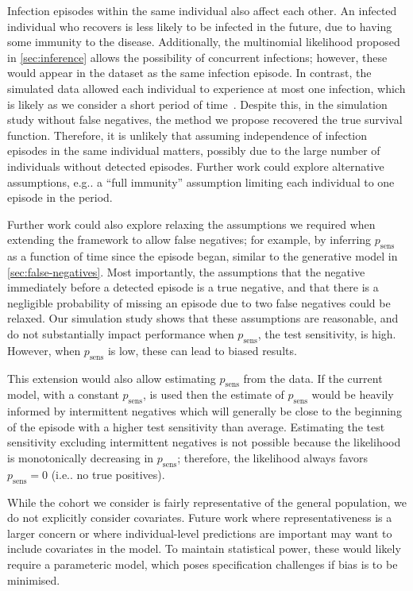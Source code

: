 \documentclass[referee,useAMS,usenatbib]{biom}
\makeatletter
\newcommand{\psens}{p_\text{sens}}
\DeclareRobustCommand\onedot{\futurelet\@let@token\@onedot}
\def\@onedot{\ifx\@let@token.\else.\null\fi\xspace}
\def\eg{e.g\onedot} \def\Eg{{E.g}\onedot}
\def\ie{i.e\onedot} \def\Ie{{I.e}\onedot}
\makeatother
\begin{document}
Infection episodes within the same individual also affect each other.
An infected individual who recovers is less likely to be infected in the future, due to having some immunity to the disease.
Additionally, the multinomial likelihood proposed in \cref{sec:inference} allows the possibility of concurrent infections; however, these would appear in the dataset as the same infection episode.
In contrast, the simulated data allowed each individual to experience at most one infection, which is likely as we consider a short period of time~\citep{milneImmunity}.
Despite this, in the simulation study without false negatives, the method we propose recovered the true survival function.
Therefore, it is unlikely that assuming independence of infection episodes in the same individual matters, possibly due to the large number of individuals without detected episodes.
Further work could explore alternative assumptions, \eg a ``full immunity'' assumption limiting each individual to one episode in the period.

Further work could also explore relaxing the assumptions we required when extending the framework to allow false negatives; for example, by inferring $\psens$ as a function of time since the episode began, similar to the generative model in \cref{sec:false-negatives}.
Most importantly, the assumptions that the negative immediately before a detected episode is a true negative, and that there is a negligible probability of missing an episode due to two false negatives could be relaxed.
Our simulation study shows that these assumptions are reasonable, and do not substantially impact performance when $\psens$, the test sensitivity, is high.
However, when $\psens$ is low, these can lead to biased results.

This extension would also allow estimating $\psens$ from the data.
If the current model, with a constant $\psens$, is used then the estimate of $\psens$ would be heavily informed by intermittent negatives which will generally be close to the beginning of the episode with a higher test sensitivity than average.
Estimating the test sensitivity excluding intermittent negatives is not possible because the likelihood is monotonically decreasing in $\psens$; therefore, the likelihood always favors $\psens = 0$ (\ie no true positives).

While the cohort we consider is fairly representative of the general population, we do not explicitly consider covariates.
Future work where representativeness is a larger concern or where individual-level predictions are important may want to include covariates in the model.
To maintain statistical power, these would likely require a parameteric model, which poses specification challenges if bias is to be minimised.
\end{document}
